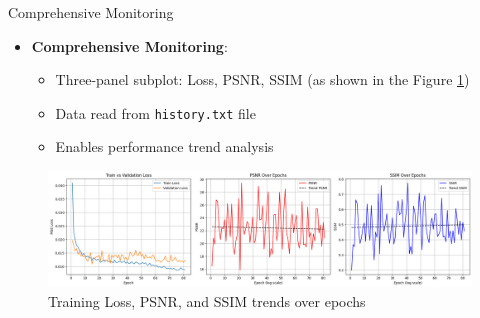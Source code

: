 \begin{frame}{Comprehensive Monitoring}
    \begin{itemize}
        \item \textbf{Comprehensive Monitoring}:
              \begin{itemize}
                  \item Three-panel subplot: Loss, PSNR, SSIM (as shown in the Figure \ref{fig:training_results})
                  \item Data read from \texttt{history.txt} file
                  \item Enables performance trend analysis
              \end{itemize}
    \end{itemize}
    \begin{figure}
        \centering
        \includegraphics[width=1.0\textwidth]{media/training_results.png}
        \caption{Training Loss, PSNR, and SSIM trends over epochs}
        \label{fig:training_results}
    \end{figure}
\end{frame}